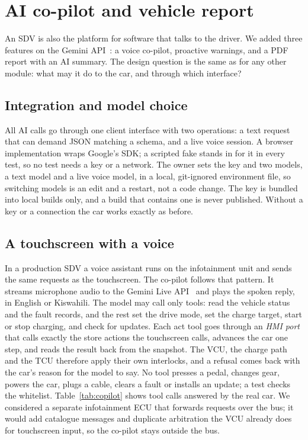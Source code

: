 \documentclass[10pt]{article}
\begin{document}
\section{AI co-pilot and vehicle report}
\label{sec:copilot}

An SDV is also the platform for software that talks to the driver. We added three features on the Gemini API~\cite{gemini_api}: a voice co-pilot, proactive warnings, and a PDF report with an AI summary. The design question is the same as for any other module: what may it do to the car, and through which interface?

\subsection{Integration and model choice}

All AI calls go through one client interface with two operations: a text request that can demand JSON matching a schema, and a live voice session. A browser implementation wraps Google's SDK; a scripted fake stands in for it in every test, so no test needs a key or a network. The owner sets the key and two models, a text model and a live voice model, in a local, git-ignored environment file, so switching models is an edit and a restart, not a code change. The key is bundled into local builds only, and a build that contains one is never published. Without a key or a connection the car works exactly as before.

\subsection{A touchscreen with a voice}

In a production SDV a voice assistant runs on the infotainment unit and sends the same requests as the touchscreen. The co-pilot follows that pattern. It streams microphone audio to the Gemini Live API~\cite{gemini_live} and plays the spoken reply, in English or Kiswahili. The model may call only \CopilotTools{} tools: \CopilotReadTools{} read the vehicle status and the fault records, and the rest set the drive mode, set the charge target, start or stop charging, and check for updates. Each act tool goes through an \emph{HMI port} that calls exactly the store actions the touchscreen calls, advances the car one step, and reads the result back from the snapshot. The VCU, the charge path and the TCU therefore apply their own interlocks, and a refusal comes back with the car's reason for the model to say. No tool presses a pedal, changes gear, powers the car, plugs a cable, clears a fault or installs an update; a test checks the whitelist. Table~\ref{tab:copilot} shows tool calls answered by the real car. We considered a separate infotainment ECU that forwards requests over the bus; it would add catalogue messages and duplicate arbitration the VCU already does for touchscreen input, so the co-pilot stays outside the bus.
\end{document}
